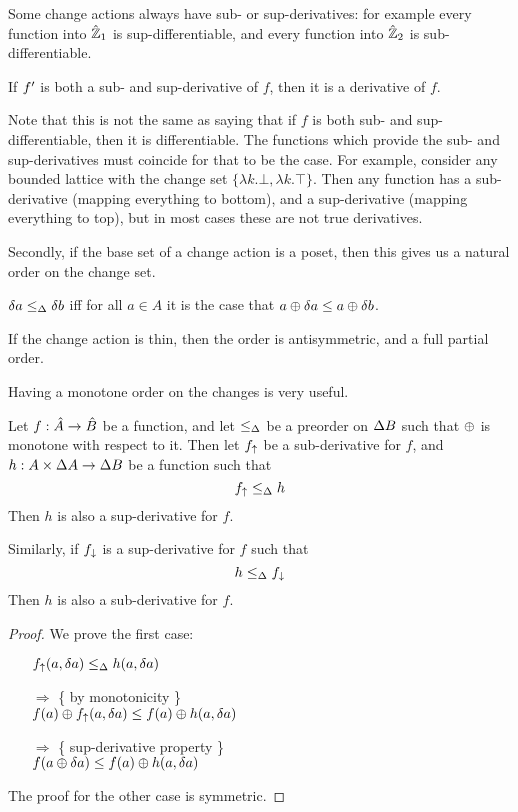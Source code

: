 Some change actions always have sub- or sup-derivatives: for example every function
into $\hat{\mathbb{Z}}_1$ is sup-differentiable, and every function into $\hat{\mathbb{Z}}_2$ is 
sub-differentiable.

\begin{prop}
  If $f'$ is both a sub- and sup-derivative of $f$, then it is a derivative of $f$.
\end{prop}

Note that this is not the same as saying that if $f$ is both sub- and
sup-differentiable, then it is differentiable. The functions which provide the
sub- and sup-derivatives must coincide for that to be the case. For example,
consider any bounded lattice with the change set $\{ \lambda k . \bot, \lambda k
 . \top \}$. Then any function has a sub-derivative (mapping everything to
 bottom), and a sup-derivative (mapping everything to top), but in most cases
 these are not true derivatives.

Secondly, if the base set of a change action is a poset, then this gives us a natural
order on the change set.

\begin{defn}
  $\delta a \leq_\Delta \delta b$ iff for all $a \in A$ it is the case that $a \oplus \delta a \leq a \oplus \delta b$.
\end{defn}

If the change action is thin, then the order is antisymmetric, and a
full partial order.

Having a monotone order on the changes is very useful.

\begin{thm}
  Let $f: \hat{A} \rightarrow \hat{B}$ be a function, and let $\leq_\Delta$ be a preorder on $\Delta B$ such that $\oplus$ is monotone with
  respect to it. Then let $f_\uparrow$ be a sub-derivative for $f$, and $h: A \times
  \Delta A \rightarrow \Delta B$ be a function such that
  $$f_\uparrow \leq_\Delta h$$
  Then $h$ is also a sup-derivative for $f$.

  Similarly, if $f_\downarrow$ is a sup-derivative for $f$ such that 
  $$h \leq_\Delta f_\downarrow$$
  Then $h$ is also a sub-derivative for $f$.
\end{thm}
\ifproofs
\begin{proof}
  We prove the first case:
  \begin{itemize}
    \item[ ]$f_\uparrow(a, \delta a) \leq_\Delta h(a, \delta a)$
    \item[$\Rightarrow$]\{ by monotonicity \}\\
      $f(a) \oplus f_\uparrow(a, \delta a) \leq f(a) \oplus h(a, \delta a)$
    \item[$\Rightarrow$]\{ sup-derivative property \}\\
      $f(a \oplus \delta a) \leq f(a) \oplus h(a, \delta a)$
  \end{itemize}

  The proof for the other case is symmetric.
\end{proof}
\fi

